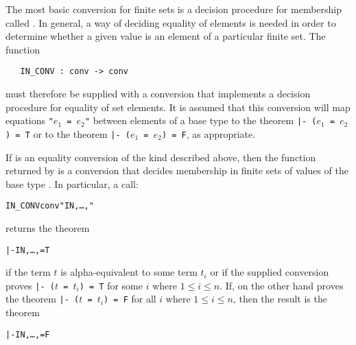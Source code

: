 The%
 most basic
conversion for finite sets is a decision procedure for membership called
.  In general, a way of deciding equality of elements is needed in
order to determine whether a given value is an element of a particular finite
set.  The function

\begin{hol}
\begin{verbatim}
   IN_CONV : conv -> conv
\end{verbatim}\end{hol}

\noindent must therefore be supplied with a conversion that implements a
decision procedure for equality of set elements.  It is assumed that this
conversion will map equations {\small\tt"$e_1$ = $e_2$"} between elements of a
base type  to the theorem {\small\tt |- ($e_1$ = $e_2$) = T} or to the
theorem {\small\tt |- ($e_1$ = $e_2$) = F}, as appropriate.

If  is an equality conversion of the kind described above, then the
function returned by  is a conversion that decides membership
in finite sets of values of the base type .  In particular, a call:

\begin{hol}
\begin{alltt}
   IN\_CONV conv " IN \lb{},\dots,\rb"
\end{alltt}\end{hol}

\noindent returns the theorem

\begin{hol}
\begin{alltt}
   |-  IN \lb{},\dots,\rb = T
\end{alltt}\end{hol}

\noindent if the term $t$ is alpha-equivalent to some term $t_i$ or if the
supplied conversion  proves {\tt |- ($t$ = $t_i$) = T} for some $i$
where $1 \leq i \leq n$.  If, on the other hand  proves the theorem
{\tt |- ($t$ = $t_i$) = F} for all $i$ where $1 \leq i \leq n$, then the result
is the theorem

\begin{hol}
\begin{alltt}
   |-  IN \lb{},\dots,\rb = F
\end{alltt}\end{hol}

